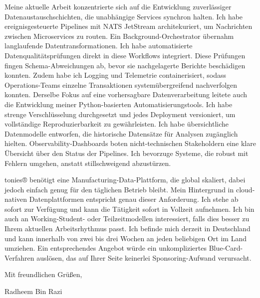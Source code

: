 \documentclass[11pt,a4paper]{coverletter}
\begin{document}
Meine aktuelle Arbeit konzentrierte sich auf die Entwicklung zuverlässiger Datenaustauschschichten, die unabhängige Services synchron halten. Ich habe ereignisgesteuerte Pipelines mit NATS JetStream architekuriert, um Nachrichten zwischen Microservices zu routen. Ein Background-Orchestrator übernahm langlaufende Datentransformationen. Ich habe automatisierte Datenqualitätsprüfungen direkt in diese Workflows integriert. Diese Prüfungen fingen Schema-Abweichungen ab, bevor sie nachgelagerte Berichte beschädigen konnten. Zudem habe ich Logging und Telemetrie containerisiert, sodass Operations-Teams einzelne Transaktionen systemübergreifend nachverfolgen konnten. Derselbe Fokus auf eine vorhersagbare Datenverarbeitung leitete auch die Entwicklung meiner Python-basierten Automatisierungstools. Ich habe strenge Verschlüsselung durchgesetzt und jedes Deployment versioniert, um vollständige Reproduzierbarkeit zu gewährleisten. Ich habe übersichtliche Datenmodelle entworfen, die historische Datensätze für Analysen zugänglich hielten. Observability-Dashboards boten nicht-technischen Stakeholdern eine klare Übersicht über den Status der Pipelines. Ich bevorzuge Systeme, die robust mit Fehlern umgehen, anstatt stillschweigend abzustürzen.

tonies® benötigt eine Manufacturing-Data-Plattform, die global skaliert, dabei jedoch einfach genug für den täglichen Betrieb bleibt. Mein Hintergrund in cloud-nativen Datenplattformen entspricht genau dieser Anforderung. Ich stehe ab sofort zur Verfügung und kann die Tätigkeit sofort in Vollzeit aufnehmen. Ich bin auch an Working-Student- oder Teilzeitmodellen interessiert, falls dies besser zu Ihrem aktuellen Arbeitsrhythmus passt. Ich befinde mich derzeit in Deutschland und kann innerhalb von zwei bis drei Wochen an jeden beliebigen Ort im Land umziehen. Ein entsprechendes Angebot würde ein unkompliziertes Blue-Card-Verfahren auslösen, das auf Ihrer Seite keinerlei Sponsoring-Aufwand verursacht.

\closing{Mit freundlichen Grüßen,}{Radheem Bin Razi}
\end{document}
